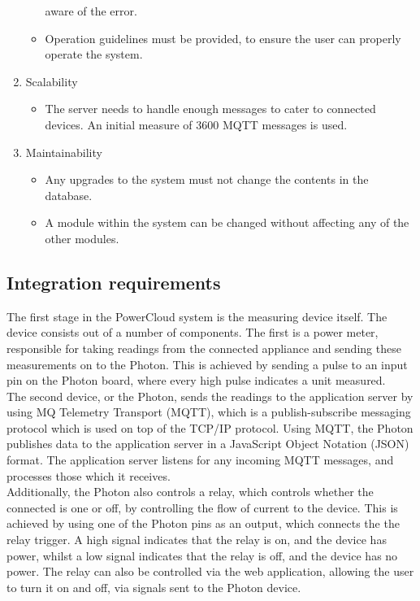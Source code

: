 \documentclass{article}
\begin{document}
\begin{enumerate}
\begin{itemize}
				aware of the error.
				\item Operation guidelines must be provided, to ensure 
				the user can properly operate the system.
			\end{itemize}
		\item Scalability
			\begin{itemize}
				\item The server needs to handle enough messages to cater 
				to connected devices. An initial measure of 3600 MQTT 
				messages is used.
			\end{itemize}
		\item Maintainability
			\begin{itemize}
				\item Any upgrades to the system must not change the 
				contents in the database.
				\item A module within the system can be changed without 
				affecting any of the other modules.
			\end{itemize}
	\end{enumerate}
	
	\newpage
	
	\subsection{Integration requirements}
	
	The first stage in the PowerCloud system is the measuring device itself. The device consists out of a number of components. The first is a power meter, responsible for taking readings from 
	the connected appliance and sending these measurements on to the Photon. This is achieved by sending a pulse to an input pin on the Photon board, where every high pulse indicates a unit 
	measured.\\
	
	The second device, or the Photon, sends the readings to the 
	application server by using MQ Telemetry Transport (MQTT), which is a 
	publish-subscribe messaging protocol which is used on top of the 
	TCP/IP protocol. Using MQTT, the Photon publishes data to the 
	application server in a JavaScript Object Notation (JSON) format. The 
	application server listens for any incoming MQTT messages, and 
	processes those which it receives.\\
	
	Additionally, the Photon also controls a relay, which controls 
	whether the connected is one or off, by controlling the flow of 
	current to the device. This is achieved by using one of the Photon 
	pins as an output, which connects the the relay trigger. A high 
	signal indicates that the relay is on, and the device has power, 
	whilst a low signal indicates that the relay is off, and the device 
	has no power. The relay can also be controlled via the web 
	application, allowing the user to turn it on and off, via signals 
	sent to the Photon device.\\
	
\end{document}
